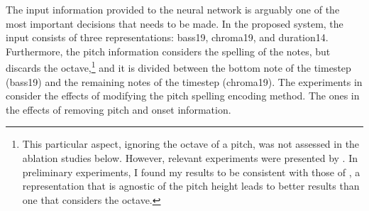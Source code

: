 
The input information provided to the neural network is
arguably one of the most important decisions that needs to
be made. In the proposed system, the input consists of three
representations: \gls{bass19}, \gls{chroma19}, and
\gls{duration14}. Furthermore, the pitch information
considers the spelling of the notes, but discards the
octave,\footnote{This particular aspect, ignoring the octave
of a pitch, was not assessed in the ablation studies below.
However, relevant experiments were presented by
\textcite{micchi2020not}. In preliminary experiments, I
found my results to be consistent with those of
\textcite{micchi2020not}, a representation that is agnostic
of the pitch height leads to better results than one that
considers the octave.} and it is divided between the bottom
note of the timestep (\gls{bass19}) and the remaining notes
of the timestep (\gls{chroma19}). The experiments in
 consider the
effects of modifying the pitch spelling encoding method. The
ones in  the effects of
removing pitch and onset information.
